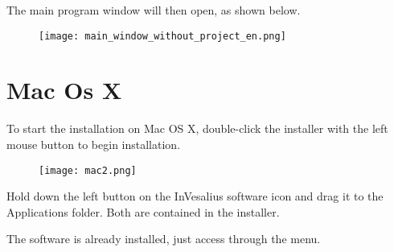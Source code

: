 \hspace{.2cm}

The main program window will then open, as shown below.

\begin{figure}[!htb]
\centering
\texttt{[image: main\_window\_without\_project\_en.png]}
\end{figure}

\section{Mac Os X}

To start the installation on Mac OS X, double-click the installer with the left mouse button to begin installation.

\begin{figure}[!htb]
\centering
\texttt{[image: mac2.png]}
\end{figure}

Hold down the left button on the InVesalius software icon and drag it to the Applications folder. Both are contained in the installer.


The software is already installed, just access through the menu.
